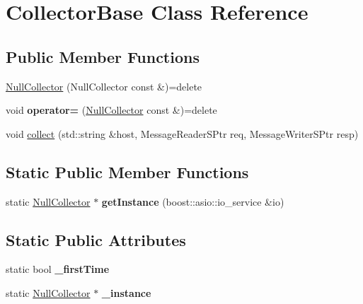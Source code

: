 \hypertarget{class_collector_base}{}\section{Collector\+Base Class Reference}
\label{class_collector_base}
\subsection*{Public Member Functions}
\begin{DoxyCompactItemize}
\item 
\hyperlink{class_collector_base_afcc95192e8c0de4e422f615d61b28b98}{Null\+Collector} (Null\+Collector const \&)=delete
\item 
\mbox{\label{class_collector_base_a8221d1e6914280d84fae334dfa90c011}} 
void {\bfseries operator=} (\hyperlink{class_collector_base_afcc95192e8c0de4e422f615d61b28b98}{Null\+Collector} const \&)=delete
\item 
void \hyperlink{class_collector_base_a0754879d950cf3eedfaad04e9572e36c}{collect} (std\+::string \&host, Message\+Reader\+S\+Ptr req, Message\+Writer\+S\+Ptr resp)
\end{DoxyCompactItemize}
\subsection*{Static Public Member Functions}
\begin{DoxyCompactItemize}
\item 
\mbox{\label{class_collector_base_a879b9a16e9ec5f96e69735b9ca71c9e2}} 
static \hyperlink{class_collector_base_afcc95192e8c0de4e422f615d61b28b98}{Null\+Collector} $\ast$ {\bfseries get\+Instance} (boost\+::asio\+::io\+\_\+service \&io)
\end{DoxyCompactItemize}
\subsection*{Static Public Attributes}
\begin{DoxyCompactItemize}
\item 
\mbox{\label{class_collector_base_a7c5bda7b50244929b91a4065b88f5d6f}} 
static bool {\bfseries \+\_\+first\+Time}
\item 
\mbox{\label{class_collector_base_a15463b6456436c380d18630311d1b39e}} 
static \hyperlink{class_collector_base_afcc95192e8c0de4e422f615d61b28b98}{Null\+Collector} $\ast$ {\bfseries \+\_\+instance}
\end{DoxyCompactItemize}


